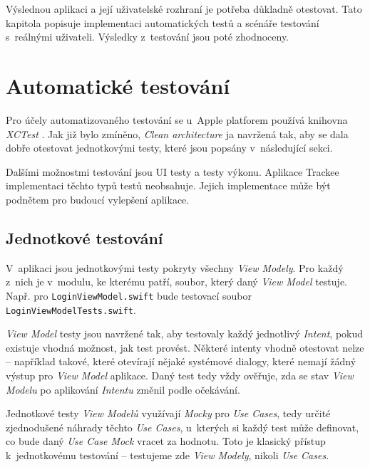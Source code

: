 Výslednou aplikaci a její uživatelské rozhraní je potřeba důkladně otestovat. Tato kapitola popisuje implementaci automatických testů a scénáře testování s~reálnými uživateli. Výsledky z~testování jsou poté zhodnoceny.

\section{Automatické testování}

Pro účely automatizovaného testování se u~Apple platforem používá knihovna \emph{XCTest} \cite{xctest}. Jak již bylo zmíněno, \emph{Clean architecture} ja navržená tak, aby se dala dobře otestovat jednotkovými testy, které jsou popsány v~následující sekci.

Dalšími možnostmi testování jsou UI testy a testy výkonu. Aplikace Trackee implementaci těchto typů testů neobsahuje. Jejich implementace může být podnětem pro budoucí vylepšení aplikace.

\subsection{Jednotkové testování}

V~aplikaci jsou jednotkovými testy pokryty všechny \emph{View Modely}. Pro každý z~nich je v~modulu, ke kterému patří, soubor, který daný \emph{View Model} testuje. Např. pro \texttt{LoginViewModel.swift} bude testovací soubor \texttt{LoginViewModelTests.swift}.

\emph{View Model} testy jsou navržené tak, aby testovaly každý jednotlivý \emph{Intent}, pokud existuje vhodná možnost, jak test provést. Některé intenty vhodně otestovat nelze – například takové, které otevírají nějaké systémové dialogy, které nemají žádný výstup pro \emph{View Model} aplikace. Daný test tedy vždy ověřuje, zda se stav \emph{View Modelu} po aplikování \emph{Intentu} změnil podle očekávání.

Jednotkové testy \emph{View Modelů} využívají \emph{Mocky} pro \emph{Use Cases}, tedy určité zjednodušené náhrady těchto \emph{Use Cases}, u~kterých si každý test může definovat, co bude daný \emph{Use Case Mock} vracet za hodnotu. Toto je klasický přístup k~jednotkovému testování – testujeme zde \emph{View Modely}, nikoli \emph{Use Cases}.

